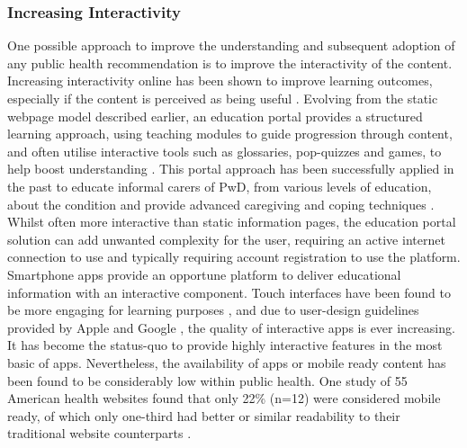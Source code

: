 \subsubsection{Increasing Interactivity}
One possible approach to improve the understanding and subsequent adoption of any public health recommendation is to improve the interactivity of the content. Increasing interactivity online has been shown to improve learning outcomes, especially if the content is perceived as being useful \cite{Oh2015, Wei2015}. Evolving from the static webpage model described earlier, an education portal provides a structured learning approach, using teaching modules to guide progression through content, and often utilise interactive tools such as glossaries, pop-quizzes and games, to help boost understanding \cite{Hattink2015}. This portal approach has been successfully applied in the past to educate informal carers of PwD, from various levels of education, about the condition and provide advanced caregiving and coping techniques \cite{Hattink2015}.
Whilst often more interactive than static information pages, the education portal solution can add unwanted complexity for the user, requiring an active internet connection to use and typically requiring account registration to use the platform.
Smartphone apps provide an opportune platform to deliver educational information with an interactive component. Touch interfaces have been found to be more engaging for learning purposes \cite{Jones2006}, and due to user-design guidelines provided by Apple and Google \cite{AppleNotifications2015,GoogleAndroid2015}, the quality of interactive apps is ever increasing. It has become the status-quo to provide highly interactive features in the most basic of apps. Nevertheless, the availability of apps or mobile ready content has been found to be considerably low within public health. One study of 55 American health websites found that only 22\% (n=12) were considered mobile ready, of which only one-third had better or similar readability to their traditional website counterparts \cite{Cunningham2015}.

